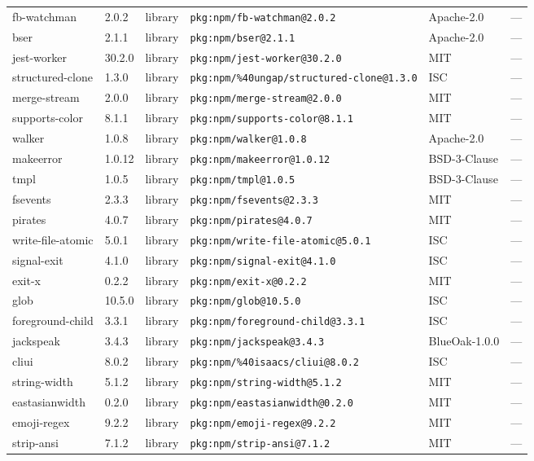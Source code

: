 \documentclass[11pt]{article}
\begin{document}
\begin{longtable}{|l|l|l|p{2.2cm}|l|p{4cm}|}
fb-watchman & 2.0.2 & library & \texttt{pkg:npm/fb-watchman@2.0.2} & Apache-2.0 & — \\
bser & 2.1.1 & library & \texttt{pkg:npm/bser@2.1.1} & Apache-2.0 & — \\
jest-worker & 30.2.0 & library & \texttt{pkg:npm/jest-worker@30.2.0} & MIT & — \\
structured-clone & 1.3.0 & library & \texttt{pkg:npm/\%40ungap/structured-clone@1.3.0} & ISC & — \\
merge-stream & 2.0.0 & library & \texttt{pkg:npm/merge-stream@2.0.0} & MIT & — \\
supports-color & 8.1.1 & library & \texttt{pkg:npm/supports-color@8.1.1} & MIT & — \\
walker & 1.0.8 & library & \texttt{pkg:npm/walker@1.0.8} & Apache-2.0 & — \\
makeerror & 1.0.12 & library & \texttt{pkg:npm/makeerror@1.0.12} & BSD-3-Clause & — \\
tmpl & 1.0.5 & library & \texttt{pkg:npm/tmpl@1.0.5} & BSD-3-Clause & — \\
fsevents & 2.3.3 & library & \texttt{pkg:npm/fsevents@2.3.3} & MIT & — \\
pirates & 4.0.7 & library & \texttt{pkg:npm/pirates@4.0.7} & MIT & — \\
write-file-atomic & 5.0.1 & library & \texttt{pkg:npm/write-file-atomic@5.0.1} & ISC & — \\
signal-exit & 4.1.0 & library & \texttt{pkg:npm/signal-exit@4.1.0} & ISC & — \\
exit-x & 0.2.2 & library & \texttt{pkg:npm/exit-x@0.2.2} & MIT & — \\
glob & 10.5.0 & library & \texttt{pkg:npm/glob@10.5.0} & ISC & — \\
foreground-child & 3.3.1 & library & \texttt{pkg:npm/foreground-child@3.3.1} & ISC & — \\
jackspeak & 3.4.3 & library & \texttt{pkg:npm/jackspeak@3.4.3} & BlueOak-1.0.0 & — \\
cliui & 8.0.2 & library & \texttt{pkg:npm/\%40isaacs/cliui@8.0.2} & ISC & — \\
string-width & 5.1.2 & library & \texttt{pkg:npm/string-width@5.1.2} & MIT & — \\
eastasianwidth & 0.2.0 & library & \texttt{pkg:npm/eastasianwidth@0.2.0} & MIT & — \\
emoji-regex & 9.2.2 & library & \texttt{pkg:npm/emoji-regex@9.2.2} & MIT & — \\
strip-ansi & 7.1.2 & library & \texttt{pkg:npm/strip-ansi@7.1.2} & MIT & — \\

\end{longtable}
\end{document}
